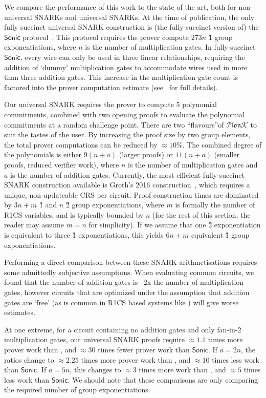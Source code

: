 \documentclass[11pt]{article} %
\newcommand{\plonk}{\ensuremath{\mathcal{P} \mathfrak{lon}\mathcal{K}}\xspace}
\newcommand{\sonic}{\ensuremath{\mathsf{Sonic}}\xspace}
\begin{document}
We compare the performance of this work to the state of the art, both for non-universal SNARKs and universal SNARKs. At the time of publication, the only fully succinct universal SNARK construction is (the fully-succinct version of) the \sonic protocol~\cite{sonic}. This protocol requires the prover compute $273n$ \G1 group exponentiations, where $n$ is the number of multiplication gates. In fully-succinct \sonic, every wire can only be used in three linear relationships, requiring the addition of `dummy' multiplication gates to accommodate wires used in more than three addition gates. This increase in the multiplication gate count is factored into the prover computation estimate (see~\cite{sonic} for full details).

Our universal SNARK requires the prover to compute 5 polynomial commitments, combined with two opening proofs to evaluate the polynomial commitments at a random challenge point. There are two ``flavours''of \plonk to suit the tastes of the user. By increasing the proof size by two group elements, the total prover computations can be reduced by $\approx10\%$. The combined degree of the polynomials is either $9(n + a)$ (larger proofs) or $11(n + a)$ (smaller proofs, reduced verifier work), where $n$ is the number of multiplication gates and $a$ is the number of addition gates.
Currently, the most efficient fully-succinct SNARK construction available is Groth's 2016 construction~\cite{Groth16}, which requires a unique, non-updateable CRS per circuit. Proof construction times are dominated by $3n + m$ \G1 and $n$ \G2 group exponentiations, where $m$ is formally the number of R1CS variables, and is typically bounded by $n$ (for the rest of this section, the reader may assume $m=n$ for simplicity). If we assume that one \G2 exponentiation is equivalent to three \G1 exponentiations, this yields $6n + m$ equivalent \G1 group exponentiations.


Performing a direct comparison between these SNARK arithmetisations requires some admittedly subjective assumptions. When evaluating common circuits, we found that the number of addition gates is ~2x the number of multiplication gates, however circuits that are optimized under the assumption that addition gates are `free' (as is common in R1CS based systems like \cite{Groth16}) will give worse estimates.

At one extreme, for a circuit containing no addition gates and only fan-in-2 multiplication gates, our universal SNARK proofs require $\approx 1.1$ times more prover work than \cite{Groth16}, and $\approx 30$ times fewer prover work than \sonic. If $a = 2n$, the ratios change to $\approx 2.25$ times more prover work than \cite{Groth16}, and $\approx 10$ times less work than \sonic. If $a = 5n$, this changes to $\approx3$ times more work than \cite{Groth16}, and $\approx 5$ times less work than \sonic. We should note that these comparisons are only comparing the required number of group exponentiations.
\end{document}
